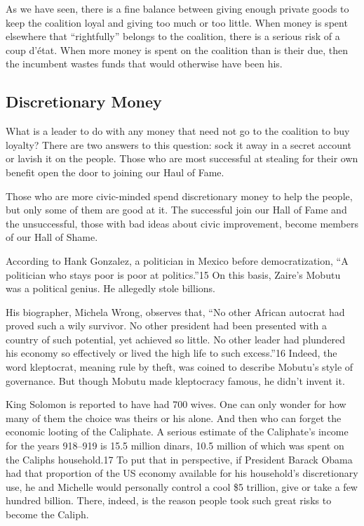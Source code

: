 \documentclass[10pt]{article}
\begin{document}
{\large As we have seen, there is a fine balance between giving enough private
goods to keep the coalition loyal and giving too much or too little. When money
is spent elsewhere that ``rightfully'' belongs to the coalition, there is a
serious risk of a coup d'\'{e}tat. When more money is spent on the coalition than
is their due, then the incumbent wastes funds that would otherwise have been
his.}

\subsection{Discretionary Money}

{\large What is a leader to do with any money that need not go to the coalition
to buy loyalty? There are two answers to this question: sock it away in a secret
account or lavish it on the people. Those who are most successful at stealing for
their own benefit open the door to joining our Haul of Fame.}

{\large Those who are more civic-minded spend discretionary money to help the
people, but only some of them are good at it. The successful join our Hall of
Fame and the unsuccessful, those with bad ideas about civic improvement, become
members of our Hall of Shame.}

{\large According to Hank Gonzalez, a politician in Mexico before
democratization, ``A politician who stays poor is poor at politics.''15 On this
basis, Zaire's Mobutu was a political genius. He allegedly stole billions.}

{\large His biographer, Michela Wrong, observes that, ``No other African
autocrat had proved such a wily survivor. No other president had been presented
with a country of such potential, yet achieved so little. No other leader had
plundered his economy so effectively or lived the high life to such excess.''16
Indeed, the word kleptocrat, meaning rule by theft, was coined to describe
Mobutu's style of governance. But though Mobutu made kleptocracy famous, he
didn't invent it.}

{\large King Solomon is reported to have had 700 wives. One can only wonder for
how many of them the choice was theirs or his alone. And then who can forget the
economic looting of the Caliphate. A serious estimate of the Caliphate's income
for the years 918--919 is 15.5 million dinars, 10.5 million of which was spent on
the Caliphs household.17 To put that in perspective, if President Barack Obama
had that proportion of the US economy available for his household's discretionary
use, he and Michelle would personally control a cool \$5 trillion, give or take a
few hundred billion. There, indeed, is the reason people took such great risks to
become the Caliph.}
\end{document}
